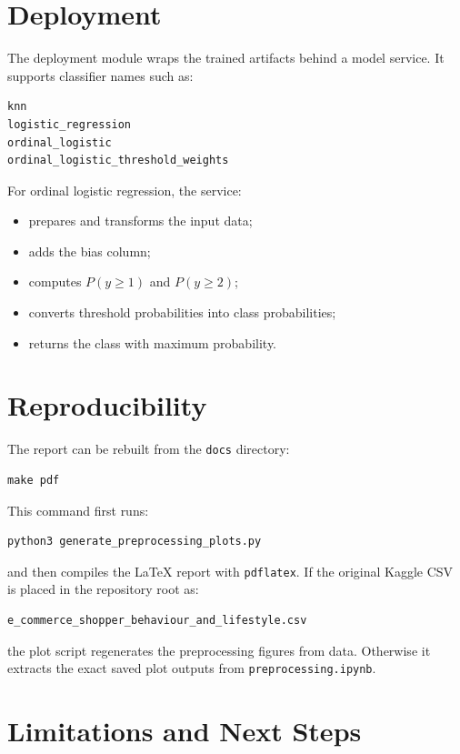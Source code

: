 \documentclass[11pt,a4paper]{article}
\begin{document}
\section{Deployment}

The deployment module wraps the trained artifacts behind a model service. It supports classifier names such as:
\begin{verbatim}
knn
logistic_regression
ordinal_logistic
ordinal_logistic_threshold_weights
\end{verbatim}

For ordinal logistic regression, the service:
\begin{itemize}
  \item prepares and transforms the input data;
  \item adds the bias column;
  \item computes $P(y \geq 1)$ and $P(y \geq 2)$;
  \item converts threshold probabilities into class probabilities;
  \item returns the class with maximum probability.
\end{itemize}

\section{Reproducibility}

The report can be rebuilt from the \texttt{docs} directory:
\begin{verbatim}
make pdf
\end{verbatim}

This command first runs:
\begin{verbatim}
python3 generate_preprocessing_plots.py
\end{verbatim}

and then compiles the LaTeX report with \texttt{pdflatex}. If the original Kaggle CSV is placed in the repository root as:
\begin{verbatim}
e_commerce_shopper_behaviour_and_lifestyle.csv
\end{verbatim}

the plot script regenerates the preprocessing figures from data. Otherwise it extracts the exact saved plot outputs from \texttt{preprocessing.ipynb}.

\section{Limitations and Next Steps}
\end{document}
